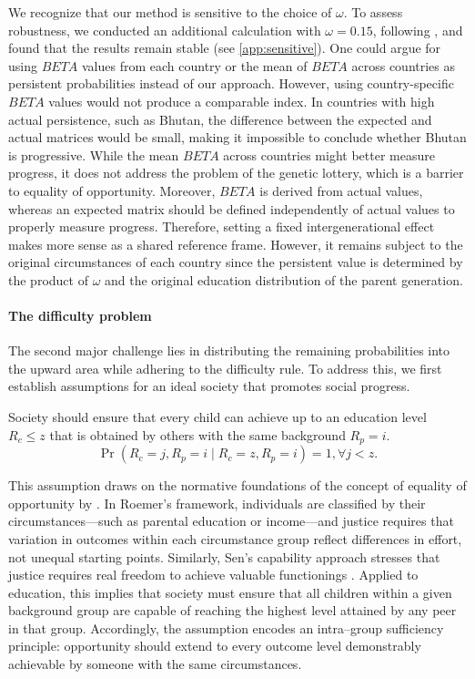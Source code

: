 We recognize that our method is sensitive to the choice of \(\omega\). To assess robustness, we conducted an additional calculation with \(\omega = 0.15\), following \citet{fleury2018intergenerational}, and found that the results remain stable (see \ref{app:sensitive}). One could argue for using \(BETA\) values from each country or the mean of \(BETA\) across countries as persistent probabilities instead of our approach. However, using country-specific \(BETA\) values would not produce a comparable index. In countries with high actual persistence, such as Bhutan, the difference between the expected and actual matrices would be small, making it impossible to conclude whether Bhutan is progressive. While the mean \(BETA\) across countries might better measure progress, it does not address the problem of the genetic lottery, which is a barrier to equality of opportunity. Moreover, \(BETA\) is derived from actual values, whereas an expected matrix should be defined independently of actual values to properly measure progress. 
Therefore, setting a fixed intergenerational effect makes more sense as a shared reference frame. However, it remains subject to the original circumstances of each country since the persistent value is determined by the product of \(\omega\) and the original education distribution of the parent generation.

\paragraph{The difficulty problem}

The second major challenge lies in distributing the remaining probabilities into the upward area while adhering to the difficulty rule. To address this, we first establish assumptions for an ideal society that promotes social progress.

\begin{assumption} \label{assump:1}
Society should ensure that every child can achieve up to  an education level \( R_c \leq z \)  that is obtained by others  with the same background \( R_p = i \).
\[
\operatorname{Pr}(R_c = j, R_p = i \mid R_c = z, R_p = i) = 1, \forall j < z.
\]
\end{assumption}
This assumption draws on the normative foundations of the concept of equality of opportunity by \citet{roemer2000equality}. In Roemer's framework, individuals are classified by their circumstances---such as parental education or income---and justice requires that variation in outcomes within each circumstance group reflect differences in effort, not unequal starting points. Similarly, Sen's capability approach stresses that justice requires real freedom to achieve valuable functionings \citep{sen2000development}. Applied to education, this implies that society must ensure that all children within a given background group are capable of reaching the highest level attained by any peer in that group. Accordingly, the assumption encodes an intra--group sufficiency principle: opportunity should extend to every outcome level demonstrably achievable by someone with the same circumstances.

